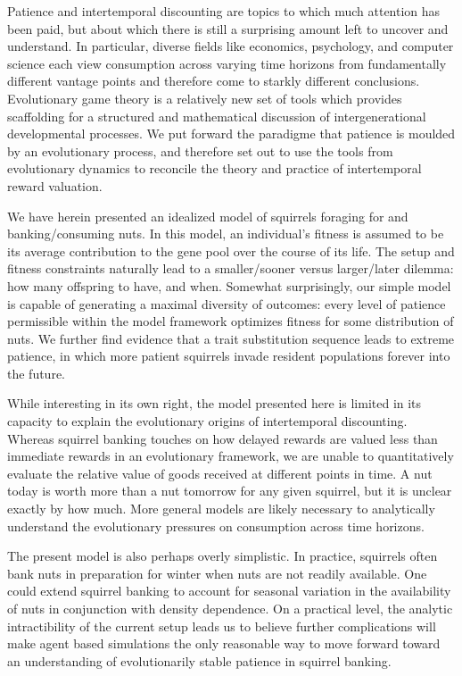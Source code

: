 \documentclass[titlepage, hidelinks, 12pt]{article}
\theoremstyle{plain}
\theoremstyle{remark}
\theoremstyle{definition}
\begin{document}
Patience and intertemporal discounting are topics to which much attention has been paid, but about which there is still a surprising amount
left to uncover and understand. In particular, diverse fields like economics, psychology, and computer science each view consumption across
varying time horizons from fundamentally different vantage points and therefore come to starkly different conclusions. 
Evolutionary game theory is a relatively new set of tools which provides scaffolding for a structured and mathematical discussion of 
intergenerational developmental processes. 
We put forward the paradigme that patience is moulded by an evolutionary process, and therefore set out to use the tools from evolutionary
dynamics to reconcile the theory and practice of intertemporal reward valuation. 

We have herein presented an idealized model of squirrels foraging for and banking/consuming nuts. In this model, an individual's fitness
is assumed to be its average contribution to the gene pool over the course of its life. The setup and fitness constraints naturally lead to a
smaller/sooner versus larger/later dilemma: how many offspring to have, and when. Somewhat surprisingly,
our simple model is capable of generating a maximal diversity of outcomes: every level of patience permissible within the model framework 
optimizes fitness for some distribution of nuts. We further find evidence that a trait substitution sequence leads to extreme patience,
in which more patient squirrels invade resident populations forever into the future. 

While interesting in its own right, the model presented here is limited in its capacity to explain the evolutionary origins of intertemporal
discounting. Whereas squirrel banking touches on how delayed rewards are
valued less than immediate rewards in an evolutionary framework, we are unable to quantitatively evaluate the relative value of goods received
at different points in time. A nut today is worth more than a nut tomorrow for any given squirrel, but it is unclear exactly by how much. More 
general models are likely necessary to analytically understand the evolutionary pressures on consumption across time horizons. 

The present model is also perhaps overly simplistic. 
In practice, squirrels often bank nuts in preparation for winter
when nuts are not readily available. 
One could extend squirrel banking to account for seasonal variation in the
availability of nuts in conjunction with density dependence. On a practical level, the analytic intractibility of the current
setup leads us to believe further complications will make agent based simulations the only reasonable way to move forward toward an understanding  
of evolutionarily stable patience in squirrel banking. 
\end{document}
